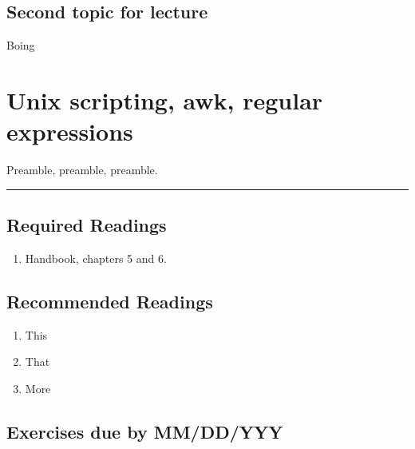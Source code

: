 \documentclass[]{book}
\providecommand{\tightlist}{%
  \setlength{\itemsep}{0pt}\setlength{\parskip}{0pt}}
\begin{document}
\hypertarget{second-topic-for-lecture-2}{%
\section{Second topic for lecture}\label{second-topic-for-lecture-2}}

Boing

\hypertarget{unix-scripting-awk-regular-expressions}{%
\chapter{Unix scripting, awk, regular expressions}\label{unix-scripting-awk-regular-expressions}}

Preamble, preamble, preamble.

\begin{center}\rule{0.5\linewidth}{\linethickness}\end{center}

\hypertarget{required-readings-3}{%
\section*{Required Readings}\label{required-readings-3}}

\begin{enumerate}
\def\labelenumi{\arabic{enumi}.}
\tightlist
\item
  Handbook, chapters 5 and 6.
\end{enumerate}

\hypertarget{recommended-readings-3}{%
\section*{Recommended Readings}\label{recommended-readings-3}}

\begin{enumerate}
\def\labelenumi{\arabic{enumi}.}
\tightlist
\item
  This
\item
  That
\item
  More
\end{enumerate}

\hypertarget{exercises-due-by-mmddyyy-3}{%
\section*{Exercises due by MM/DD/YYY}\label{exercises-due-by-mmddyyy-3}}
\end{document}
